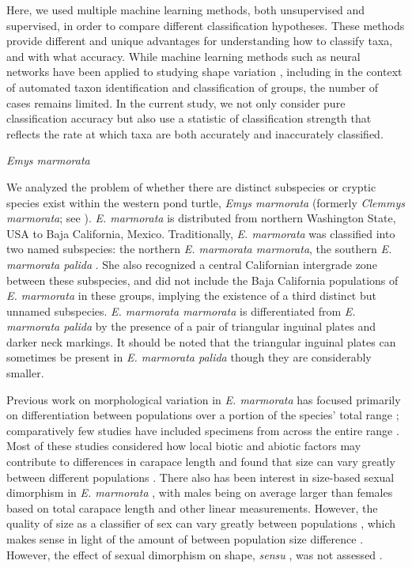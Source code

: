 \documentclass[12pt,letterpaper]{article}
\renewcommand{\subsection}[1]{%
\bigskip
\begin{center}
\begin{large}
\normalfont\itshape #1
\end{large}
\end{center}}
\begin{document}
Here, we used multiple machine learning methods, both unsupervised and supervised, in order to compare different classification hypotheses. These methods provide different and unique advantages for understanding how to classify taxa, and with what accuracy. While machine learning methods such as neural networks have been applied to studying shape variation \citep{Baylac2003,Dobigny2003,VandenBrink2011,MacLeod2007}, including in the context of automated taxon identification and classification of groups, the number of cases remains limited. In the current study, we not only consider pure classification accuracy but also use a statistic of classification strength that reflects the rate at which taxa are both accurately and inaccurately classified. 


\subsection{\textit{Emys marmorata}}
We analyzed the problem of whether there are distinct subspecies or cryptic species exist within the western pond turtle, \textit{Emys marmorata} (formerly \emph{Clemmys marmorata}; see \citealp{Feldman2002}). \textit{E. marmorata} is distributed from northern Washington State, USA to Baja California, Mexico. Traditionally, \textit{E. marmorata} was classified into two named subspecies: the northern \textit{E. marmorata marmorata}, the southern \textit{E. marmorata palida} \citep{Seeliger1945}. She also recognized a central Californian intergrade zone between these subspecies, and did not include the Baja California populations of \textit{E. marmorata} in these groups, implying the existence of a third distinct but unnamed subspecies. \textit{E. marmorata marmorata} is differentiated from \textit{E. marmorata palida} by the presence of a pair of triangular inguinal plates and darker neck markings. It should be noted that the triangular inguinal plates can sometimes be present in \textit{E. marmorata palida} though they are considerably smaller.

Previous work on morphological variation in \textit{E. marmorata} has focused primarily on differentiation between populations over a portion of the species' total range \citep{Lubcke2007,Germano2009,Germano2008,Bury2010}; comparatively few studies have included specimens from across the entire range \citep{Holland1992}. Most of these studies considered how local biotic and abiotic factors may contribute to differences in carapace length and found that size can vary greatly between different populations \citep{Lubcke2007,Germano2009,Germano2008}. There also has been interest in size-based sexual dimorphism in \textit{E. marmorata} \citep{Lubcke2007,Germano2009,Holland1992}, with males being on average larger than females based on total carapace length and other linear measurements. However, the quality of size as a classifier of sex can vary greatly between populations \citep{Holland1992}, which makes sense in light of the amount of between population size difference \citep{Lubcke2007,Germano2009}. However, the effect of sexual dimorphism on shape, \textit{sensu} \citet{Kendall1977a}, was not assessed \citep{Holland1992,Lubcke2007,Germano2008}.
\end{document}
